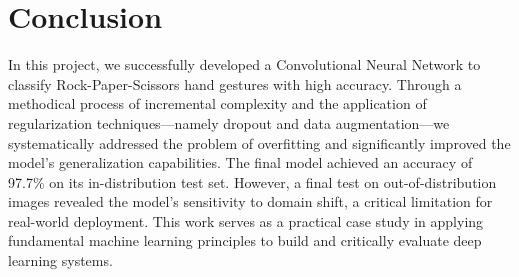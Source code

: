 \documentclass[pdflatex,sn-mathphys-num]{sn-jnl}%
\theoremstyle{thmstyleone}%
\theoremstyle{thmstyletwo}%
\theoremstyle{thmstylethree}%
\begin{document}
\section{Conclusion}\label{sec13}

In this project, we successfully developed a Convolutional Neural Network to classify Rock-Paper-Scissors hand gestures with high accuracy. Through a methodical process of incremental complexity and the application of regularization techniques—namely dropout and data augmentation—we systematically addressed the problem of overfitting and significantly improved the model's generalization capabilities. The final model achieved an accuracy of 97.7\% on its in-distribution test set. However, a final test on out-of-distribution images revealed the model's sensitivity to domain shift, a critical limitation for real-world deployment. This work serves as a practical case study in applying fundamental machine learning principles to build and critically evaluate deep learning systems.

\backmatter
\end{document}
